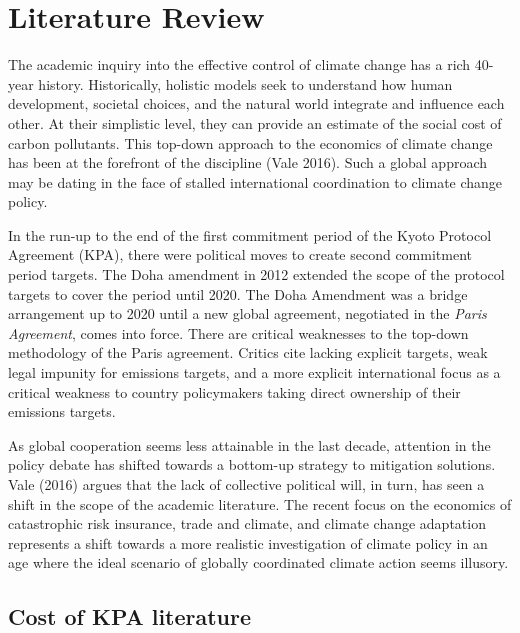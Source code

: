 \documentclass[
  10pt,
]{article}
\begin{document}
\hypertarget{literature-review}{%
\section{Literature Review}\label{literature-review}}

The academic inquiry into the effective control of climate change has a
rich 40-year history. Historically, holistic models seek to understand
how human development, societal choices, and the natural world integrate
and influence each other. At their simplistic level, they can provide an
estimate of the social cost of carbon pollutants. This top-down approach
to the economics of climate change has been at the forefront of the
discipline (Vale 2016). Such a global approach may be dating in the face
of stalled international coordination to climate change policy.

In the run-up to the end of the first commitment period of the Kyoto
Protocol Agreement (KPA), there were political moves to create second
commitment period targets. The Doha amendment in 2012 extended the scope
of the protocol targets to cover the period until 2020. The Doha
Amendment was a bridge arrangement up to 2020 until a new global
agreement, negotiated in the \emph{Paris Agreement}, comes into force.
There are critical weaknesses to the top-down methodology of the Paris
agreement. Critics cite lacking explicit targets, weak legal impunity
for emissions targets, and a more explicit international focus as a
critical weakness to country policymakers taking direct ownership of
their emissions targets.

As global cooperation seems less attainable in the last decade,
attention in the policy debate has shifted towards a bottom-up strategy
to mitigation solutions. Vale (2016) argues that the lack of collective
political will, in turn, has seen a shift in the scope of the academic
literature. The recent focus on the economics of catastrophic risk
insurance, trade and climate, and climate change adaptation represents a
shift towards a more realistic investigation of climate policy in an age
where the ideal scenario of globally coordinated climate action seems
illusory.

\hypertarget{cost-of-kpa-literature}{%
\subsection{Cost of KPA literature}\label{cost-of-kpa-literature}}
\end{document}
